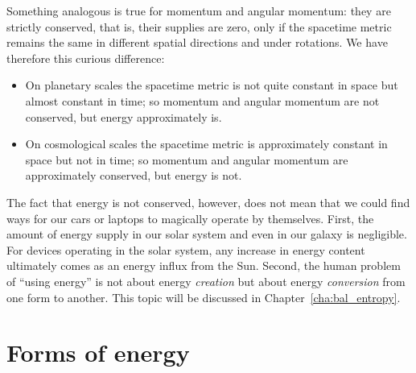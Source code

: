 \documentclass[a4paper,12pt,%
onecolumn,oneside,%
british%
]{memoir}
\newcommand{\mynotew}[1]{{\footnotesize\color{midgrey}\faIcon{tools}\ #1}}
\renewcommand*{\|}[1][]{\nonscript\:#1\vert\nonscript\:\mathopen{}}
\newcommand*{\chap}{Chapter}%
\begin{document}
\medskip

Something analogous is true for momentum and angular momentum: they are strictly conserved, that is, their supplies are zero, only if the spacetime metric remains the same in different spatial directions and under rotations. We have therefore this curious difference:
\begin{itemize}
\item On planetary scales the spacetime metric is not quite constant in space but almost constant in time; so momentum and angular momentum are not conserved, but energy approximately is.
\item On cosmological scales the spacetime metric is approximately constant in space but not in time; so momentum and angular momentum are approximately conserved, but energy is not.
\end{itemize}

\medskip

The fact that energy is not conserved, however, does not mean that we could find ways for our cars or laptops to magically operate by themselves. First, the amount of energy supply in our solar system and even in our galaxy is negligible. %
For devices operating in the solar system, any increase in energy content ultimately comes as an energy influx from the Sun. Second, the human problem of \enquote{using energy} is not about energy \emph{creation} but about energy \emph{conversion} from one form to another. This topic will be discussed in \chap~\ref{cha:bal_entropy}.



\section{Forms of energy}
\label{sec:energy_forms}
\end{document}
